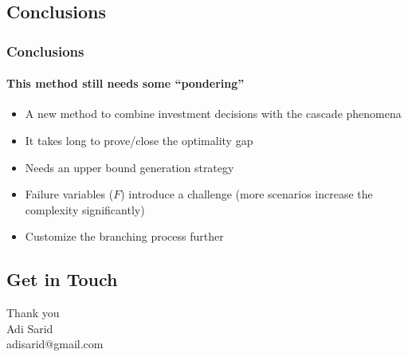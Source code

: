 \documentclass{beamer}
\begin{document}
\subsection{Conclusions}
\begin{frame}
\frametitle{Conclusions}
\framesubtitle{This method still needs some ``pondering''}
\begin{itemize}
  \item A new method to combine investment decisions with the cascade phenomena
	\item It takes long to prove/close the optimality gap
	\item Needs an upper bound generation strategy
	\item Failure variables ($F$) introduce a challenge (more scenarios increase the complexity significantly)
	\item Customize the branching process further
\end{itemize}
\end{frame}

\subsection{Get in Touch}
\begin{frame}
\LARGE Thank you\\
\vspace{2.5cm}
\normalsize
Adi Sarid\\
adisarid@gmail.com
\end{frame}
\end{document}
